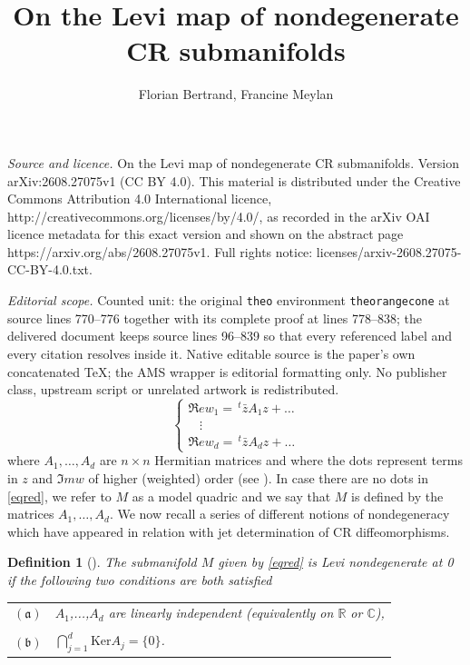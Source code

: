 \documentclass[10pt,a4paper]{amsart}
\newcommand{\C}{\mathbb C}
\newcommand{\R}{\mathbb R}
\newcommand{\transp}{\,^t}
\newcommand{\aaa}{\mathfrak{(a)}}
\newcommand{\bbb}{\mathfrak{(b)}}
\newtheorem{defi}[theo]{Definition}
\numberwithin{equation}{section}
\begin{document}
\title[On the Levi map of nondegenerate CR submanifolds]{On the Levi map of nondegenerate CR submanifolds}
\author{Florian Bertrand, Francine Meylan}
\date{}
\maketitle
\noindent\emph{Source and licence.} On the Levi map of nondegenerate CR submanifolds. Version arXiv:2608.27075v1 (CC BY 4.0). This material is distributed under the Creative Commons Attribution 4.0 International licence, http://creativecommons.org/licenses/by/4.0/, as recorded in the arXiv OAI licence metadata for this exact version and shown on the abstract page https://arxiv.org/abs/2608.27075v1. Full rights notice: licenses/arxiv-2608.27075-CC-BY-4.0.txt.\par\smallskip
\noindent\textit{Editorial scope.} Counted unit: the original \texttt{theo} environment \texttt{theorangecone} at source lines 770--776 together with its complete proof at lines 778--838; the delivered document keeps source lines 96--839 so that every referenced label and every citation resolves inside it. Native editable source is the paper's own concatenated TeX; the AMS wrapper is editorial formatting only. No publisher class, upstream script or unrelated artwork is redistributed.
\begin{equation}\label{eqred}
\begin{cases}
\Re e  w_1= \transp\bar z A_1 z+ \ldots\\
\ \ \ \ \vdots \\
\Re e  w_d = \transp\bar z A_d z+ \ldots
\end{cases}
\end{equation}
where $A_1,\hdots,A_d$ are $n\times n$ Hermitian matrices and where the dots represent terms in $z$ and $\Im m w$ of higher (weighted) order (see \cite{bo,bl-me}). In case there are no dots in \eqref{eqred}, we refer to $M$ as a model quadric and we say that $M$ is defined by the matrices $A_1,\ldots,A_d$.  We now recall a series of different notions of nondegeneracy which have appeared in relation with jet determination of CR diffeomorphisms. 





\begin{defi} [\cite{be1}]\label{defnondegbe}
The submanifold $M$ given by \eqref{eqred} is  {\it Levi nondegenerate} at 0 if the following two conditions are both satisfied
\begin{center}
\begin{tabular}{cl}
$\aaa$ & $A_1$,...,$A_d$ are linearly independent (equivalently on $\R$ or $\C$),\\
\\
$\bbb$ & $\bigcap_{j=1}^d\mathrm{Ker}A_j=\{0\}$.
\end{tabular}
\end{center}
\end{defi}
\end{document}
